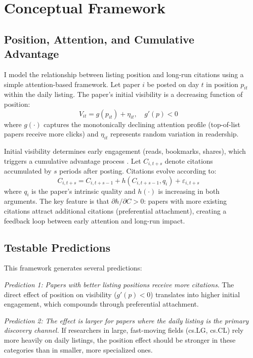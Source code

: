 \documentclass[12pt]{article}
\begin{document}
\section{Conceptual Framework}

\subsection{Position, Attention, and Cumulative Advantage}

I model the relationship between listing position and long-run citations using a simple attention-based framework. Let paper $i$ be posted on day $t$ in position $p_{it}$ within the daily listing. The paper's initial visibility is a decreasing function of position:
\begin{equation}
V_{it} = g(p_{it}) + \eta_{it}, \quad g'(p) < 0
\end{equation}
where $g(\cdot)$ captures the monotonically declining attention profile (top-of-list papers receive more clicks) and $\eta_{it}$ represents random variation in readership.

Initial visibility determines early engagement (reads, bookmarks, shares), which triggers a cumulative advantage process \citep{merton1968, barabasi1999}. Let $C_{i,t+s}$ denote citations accumulated by $s$ periods after posting. Citations evolve according to:
\begin{equation}
C_{i,t+s} = C_{i,t+s-1} + h(C_{i,t+s-1}, q_i) + \varepsilon_{i,t+s}
\end{equation}
where $q_i$ is the paper's intrinsic quality and $h(\cdot)$ is increasing in both arguments. The key feature is that $\partial h / \partial C > 0$: papers with more existing citations attract additional citations (preferential attachment), creating a feedback loop between early attention and long-run impact.

\subsection{Testable Predictions}

This framework generates several predictions:

\textit{Prediction 1: Papers with better listing positions receive more citations.} The direct effect of position on visibility ($g'(p) < 0$) translates into higher initial engagement, which compounds through preferential attachment.

\textit{Prediction 2: The effect is larger for papers where the daily listing is the primary discovery channel.} If researchers in large, fast-moving fields (cs.LG, cs.CL) rely more heavily on daily listings, the position effect should be stronger in these categories than in smaller, more specialized ones.
\end{document}
